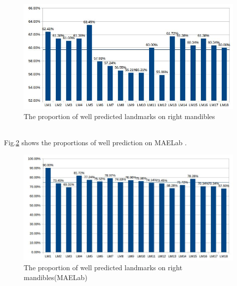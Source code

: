 \documentclass[12pt,a4paper]{article}
\begin{document}
\begin{figure}[h!]
	\centering
	\includegraphics[scale=0.65]{images/md}
	\caption{The proportion of well predicted landmarks on right mandibles}
	\label{mdfig}
\end{figure}~\\[2cm]
Fig.\ref{mdfig2} shows the proportions of well prediction on MAELab \cite{le:hal-01571440}.
\begin{figure}[h!]
	\centering
	\includegraphics[scale=0.55]{images/mdSIFT}
	\caption{The proportion of well predicted landmarks on right mandibles(MAELab)}
	\label{mdfig2}
\end{figure}~\\
\end{document}
